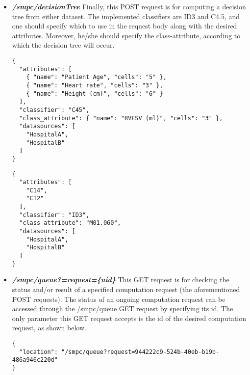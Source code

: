 \begin{itemize}
\item \textbf{\textit{/smpc/decisionTree}}
Finally, this POST request is for computing a decision tree from either dataset.
The implemented classifiers are ID3 and C4.5, and one should specify which to use in the request body along with the desired attributes.
Moreover, he/she should specify the class-attribute, according to which the decision tree will occur.

{
\begin{verbatim}
{
  "attributes": [
    { "name": "Patient Age", "cells": "5" },
    { "name": "Heart rate", "cells": "3" },
    { "name": "Height (cm)", "cells": "6" }
  ],
  "classifier": "C45",
  "class_attribute": { "name": "RVESV (ml)", "cells": "3" },
  "datasources": [
    "HospitalA",
    "HospitalB"
  ]
}
\end{verbatim}
\label{sc:decisionTree-post-numerical}
}

{
\begin{verbatim}
{
  "attributes": [
    "C14",
    "C12"
  ],
  "classifier": "ID3",
  "class_attribute": "M01.060",
  "datasources": [
    "HospitalA",
    "HospitalB"
  ]
}
\end{verbatim}
\label{sc:decisionTree-post-categorical}
}




\item \textbf{\textit{/smpc/queue?=request=\{uid\}}}
This GET request is for checking the status and/or result of a specified computation request (the aforementioned POST requests).
The status of an ongoing computation request can be accessed through the /smpc/queue GET request by specifying its id.
The only parameter this GET request accepts is the id of the desired computation request, as shown below.

{
\begin{verbatim}
{
  "location": "/smpc/queue?request=944222c9-524b-40eb-b19b-486a946c220d"
}
\end{verbatim}
\label{sc:get}
}


\end{itemize}
